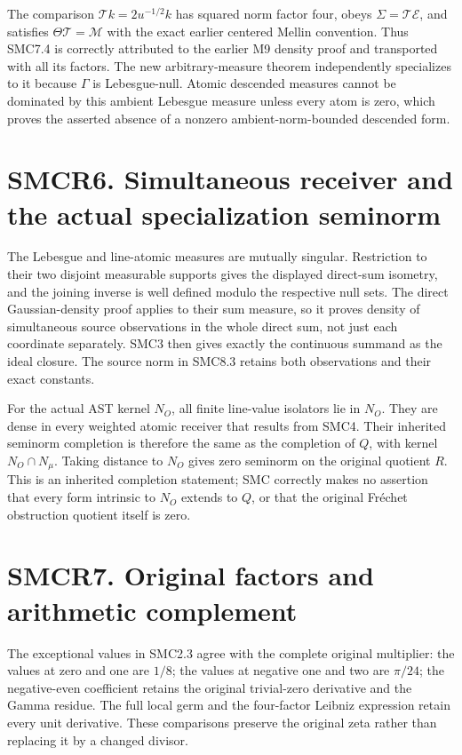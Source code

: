The comparison \(\mathcal T k=2u^{-1/2}k\) has squared norm factor four,
obeys \(\Sigma=\mathcal T\mathcal E\), and satisfies
\(\Theta\mathcal T=\mathcal M\) with the exact earlier centered Mellin
convention. Thus SMC7.4 is correctly attributed to the earlier M9
density proof and transported with all its factors. The new
arbitrary-measure theorem independently specializes to it because
\(\Gamma\) is Lebesgue-null. Atomic descended measures cannot be
dominated by this ambient Lebesgue measure unless every atom is zero,
which proves the asserted absence of a nonzero ambient-norm-bounded
descended form.

\section{SMCR6. Simultaneous receiver and the actual specialization
seminorm}\label{smcr6.-simultaneous-receiver-and-the-actual-specialization-seminorm}

The Lebesgue and line-atomic measures are mutually singular. Restriction
to their two disjoint measurable supports gives the displayed direct-sum
isometry, and the joining inverse is well defined modulo the respective
null sets. The direct Gaussian-density proof applies to their sum
measure, so it proves density of simultaneous source observations in the
whole direct sum, not just each coordinate separately. SMC3 then gives
exactly the continuous summand as the ideal closure. The source norm in
SMC8.3 retains both observations and their exact constants.

For the actual AST kernel \(N_O\), all finite line-value isolators lie
in \(N_O\). They are dense in every weighted atomic receiver that
results from SMC4. Their inherited seminorm completion is therefore the
same as the completion of \(Q\), with kernel \(N_O\cap N_\mu\). Taking
distance to \(N_O\) gives zero seminorm on the original quotient \(R\).
This is an inherited completion statement; SMC correctly makes no
assertion that every form intrinsic to \(N_O\) extends to \(Q\), or that
the original Fréchet obstruction quotient itself is zero.

\section{SMCR7. Original factors and arithmetic
complement}\label{smcr7.-original-factors-and-arithmetic-complement}

The exceptional values in SMC2.3 agree with the complete original
multiplier: the values at zero and one are \(1/8\); the values at
negative one and two are \(\pi/24\); the negative-even coefficient
retains the original trivial-zero derivative and the Gamma residue. The
full local germ and the four-factor Leibniz expression retain every unit
derivative. These comparisons preserve the original zeta rather than
replacing it by a changed divisor.

